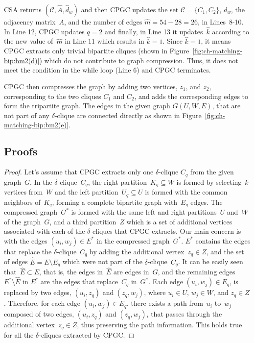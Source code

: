 \textsf{CSA} returns $(\mathscr{C}, \hat{A}, \hat{d}_w)$ and then \textsf{CPGC} updates the set $\mathscr{C} =\{C_{1}, C_{2}\}$, $d_w$, the adjacency matrix~$A$, and the number of edges $\hat{m}= 54-28 =26$, in Lines~\mbox{8-10}. In Line 12, \textsf{CPGC} updates $q=2$ and finally, in Line 13 it updates~$\hat{k}$ according to the new value of~$\hat{m}$ in Line 11 which results in $\hat{k} =1$. Since $\hat{k} =1$, it means \textsf{CPGC} extracts only trivial bipartite cliques (shown in Figure~\ref{fig:ch-matching-bip:bm2(d)}) which do not contribute to graph compression. Thus, it does not meet the condition in the while loop (Line 6) and \textsf{CPGC} terminates.

\textsf{CPGC} then compresses the graph by adding two vertices, $z_1$, and  $z_2$, corresponding to the two cliques $C_1$ and $C_2$, and adds the corresponding edges to form the tripartite graph. The edges in the given graph $G(U,W,E)$, that are not part of any $\delta$-clique are connected directly as shown in Figure~\ref{fig:ch-matching-bip:bm2(e)}. 



\subsection{Proofs\\ }\label{sec:appendix:proofs}


\hspace*{-0.2cm}
\begin{proof} Let's assume that \textsf{CPGC} extracts only one $\delta$-clique $C_q$ from the given graph~$G$.  In  the $\delta$-clique~$C_q$, the right partition~$K_q\subseteq W$ is formed by selecting~$\hat{k}$ vertices from~$W$ and the left partition~$U_q \subseteq U$ is formed with the common neighbors of~$K_q$, forming a complete bipartite graph with~$E_q$ edges. The compressed graph~$G^*$ is formed with the same left and right partitions~$U$ and~$W$ of the graph~$G$, and a third partition~$Z$ which is a set of additional vertices associated with each of the $\delta$-cliques that \textsf{CPGC} extracts.  Our main concern is with the edges $(u_i,w_j) \in E^*$ in the compressed graph~$G^*$. $E^*$ contains the edges that replace the $\delta$-clique~$C_q$ by adding the additional vertex~$z_q \in Z$, and the set of edges $\hat{E} = E \setminus E_q$ which were not part of the $\delta$-clique~$C_q$. 
It can be easily seen that~$\hat{E} \subset E$, that is, the edges in~$\hat{E}$ are edges in~$G$, and the remaining edges $E^* \setminus \hat{E}$ in $E^*$ are the edges that replace~$C_q$ in~$G^*$. Each edge $(u_i,w_j) \in E_q$, is replaced by two edges, $(u_i,z_q)$ and $(z_q,w_j)$, where $u_i \in U$, $w_j \in W$, and $z_q \in Z$. Therefore, for each edge $(u_i,w_j) \in E_q$, there exists a path from~$u_i$ to~$w_j$ composed of two edges, $(u_i,z_q)$ and $(z_q,w_j)$, that passes through the additional vertex~$z_q \in Z$, thus preserving the path information. This holds true for all the $\delta$-cliques extracted by \textsf{CPGC}.
\end{proof}

